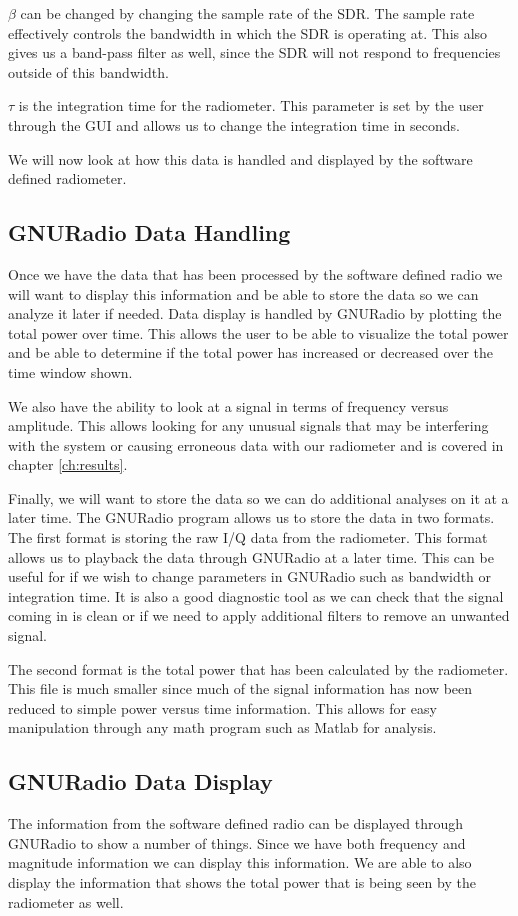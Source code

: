 $\beta$ can be changed by changing the sample rate of the SDR.  The sample rate effectively controls the bandwidth in which the SDR is operating at.  This also gives us a band-pass filter as well, since the SDR will not respond to frequencies outside of this bandwidth.  

$\tau$ is the integration time for the radiometer.  This parameter is set by the user through the GUI and allows us to change the integration time in seconds.

We will now look at how this data is handled and displayed by the software defined radiometer.

\subsection{GNURadio Data Handling}
Once we have the data that has been processed by the software defined radio we will want to display this information and be able to store the data so we can analyze it later if needed.  Data display is handled by GNURadio by plotting the total power over time.  This allows the user to be able to visualize the total power and be able to determine if the total power has increased or decreased over the time window shown.  

We also have the ability to look at a signal in terms of frequency versus amplitude.  This allows looking for any unusual signals that may be interfering with the system or causing erroneous data with our radiometer and is covered in chapter \ref{ch:results}.  

Finally, we will want to store the data so we can do additional analyses on it at a later time.  The GNURadio program allows us to store the data in two formats.  The first format is storing the raw I/Q data from the radiometer.  This format allows us to playback the data through GNURadio at a later time.  This can be useful for if we wish to change parameters in GNURadio such as bandwidth or integration time.  It is also a good diagnostic tool as we can check that the signal coming in is clean or if we need to apply additional filters to remove an unwanted signal.

The second format is the total power that has been calculated by the radiometer.  This file is much smaller since much of the signal information has now been reduced to simple power versus time information.  This allows for easy manipulation through any math program such as Matlab for analysis.  

\subsection{GNURadio Data Display}
The information from the software defined radio can be displayed through GNURadio to show a number of things.  Since we have both frequency and magnitude information we can display this information.  We are able to also display the information that shows the total power that is being seen by the radiometer as well.

